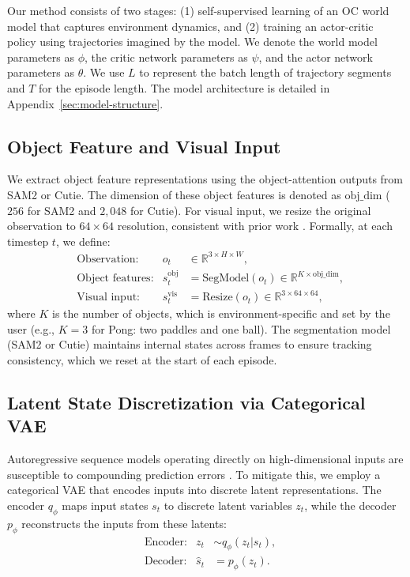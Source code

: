 \documentclass{article} %
\begin{document}
Our method consists of two stages: (1) self-supervised learning of an OC world model that captures environment dynamics, and (2) training an actor-critic policy using trajectories imagined by the model. We denote the world model parameters as $\phi$, the critic network parameters as $\psi$, and the actor network parameters as $\theta$. We use $L$ to represent the batch length of trajectory segments and $T$ for the episode length. The model architecture is detailed in Appendix~\ref{sec:model-structure}.


\subsection{Object Feature and Visual Input}

We extract object feature representations using the object-attention outputs from SAM2 or Cutie. The dimension of these object features is denoted as $\text{obj\_dim}$ ($256$ for SAM2 and $2,048$ for Cutie). For visual input, we resize the original observation to $64 \times 64$ resolution, consistent with prior work \citep{hafner_mastering_2023, zhang_storm_2023}. Formally, at each timestep $t$, we define:
\begin{equation} \label{eq:input-state}
\begin{aligned}
&\text{Observation:} & o_t & \in \mathbb{R}^{3\times H \times W}, \\
&\text{Object features:} & s^{\mathrm{obj}}_t &= \mathrm{SegModel}(o_t) \in \mathbb{R}^{K\times \mathrm{obj\_dim}}, \\
&\text{Visual input:} & s^{\mathrm{vis}}_t &= \mathrm{Resize}(o_t) \in \mathbb{R}^{3 \times 64 \times 64},
\end{aligned}
\end{equation}
where $K$ is the number of objects, which is environment-specific and set by the user (e.g., $K=3$ for Pong: two paddles and one ball). The segmentation model (SAM2 or Cutie) maintains internal states across frames to ensure tracking consistency, which we reset at the start of each episode.

\subsection{Latent State Discretization via Categorical VAE}

Autoregressive sequence models operating directly on high-dimensional inputs are susceptible to compounding prediction errors \citep{hafner_mastering_2023, zhang_storm_2023}. To mitigate this, we employ a categorical VAE \citep{kingma_auto-encoding_2022, hafner_mastering_2023} that encodes inputs into discrete latent representations. The encoder $q_\phi$ maps input states $s_t$ to discrete latent variables $z_t$, while the decoder $p_\phi$ reconstructs the inputs from these latents:
\begin{equation} \label{eq:world-model-enc-dec}
\begin{aligned}
&\text{Encoder:} & z_t &\sim q_\phi(z_t | s_t), \\
&\text{Decoder:} & \hat{s}_t &= p_\phi(z_t).
\end{aligned}
\end{equation}
\end{document}
